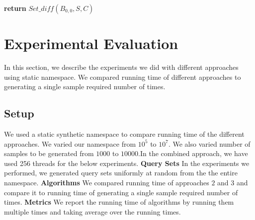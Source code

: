 \documentclass[a4paper]{article}
\begin{document}
\begin{algorithm}
\caption{$Set\_difference (B_{ij}, S, C)$}
\begin{algorithmic}[1]
 \State 
 \textbf{return} $Set\_diff (B_{0,0}, S, C)$
\EndProcedure
\end{algorithmic}
\end{algorithm}







\section{Experimental Evaluation}
In this section, we describe the experiments we did with different approaches using static namespace. We compared running time of different approaches to generating a single sample required number of times.

\subsection{Setup}
We used a static synthetic namespace to compare running time of the different  approaches. We varied our namespace from $10^5$ to $10^7$. We also varied number of samples to be generated from $1000$ to $10000$.In the combined approach, we have used 256 threads for the below experiments. \newline
\textbf{Query Sets} In the experiments we performed, we generated query sets uniformly at random from the the entire namespace.
\newline
\textbf{Algorithms} We compared running time of approaches $2$ and $3$ and compare it to running time of generating a single sample required number of times.
\newline
\textbf{Metrics} We report the running time of algorithms by running them multiple times and taking average over the running times.
\end{document}
